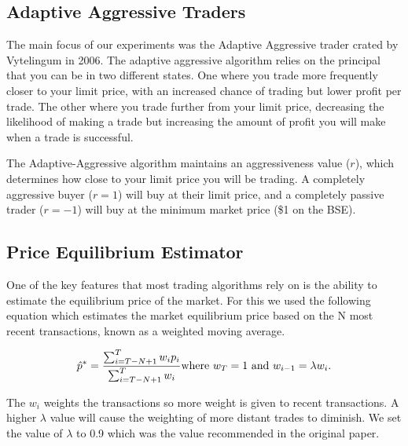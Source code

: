 \documentclass[preprint]{acm_proc_article-sp} %
\begin{document}
\subsection{Adaptive Aggressive Traders} \label{sec:AA}
The main focus of our experiments was the Adaptive Aggressive trader crated by
Vytelingum in 2006\cite{AA_thesis}. The adaptive aggressive algorithm relies on the principal that you can be in
two different states. One where you trade more frequently closer to your limit
price, with an increased chance of trading but lower profit per trade. The other where you
trade further from your limit price, decreasing the likelihood of making a
trade but increasing the amount of profit you will make when a trade is
successful.

The Adaptive-Aggressive algorithm maintains an aggressiveness value ($r$), which
determines how close to your limit price you will be trading. A completely
aggressive buyer ($r = 1$) will buy at their limit price, and a completely
passive trader ($r = -1$) will buy at the minimum market price (\$1 on the BSE).\\


\subsection{Price Equilibrium Estimator}
One of the key features that most trading algorithms rely on is the ability to
estimate the equilibrium price of the market. For this we used the following
equation which estimates the market equilibrium price based on the N most
recent transactions, known as a weighted moving average.

\begin{equation}
    \label{eqn:equilibrium_estimator}
    \hat p^* = \frac{\sum^T_{i=T-N+1}w_ip_i}{\sum^T_{i=T-N+1}w_i}\\
    \text{where $w_T = 1$ and $w_{i-1} = \lambda w_i$.}
\end{equation}

The $w_i$ weights the transactions so more weight is given to recent transactions. A higher $\lambda$ value will cause the weighting of more distant trades to diminish. We set the value of $\lambda$ to 0.9 which was the value recommended in the original paper\cite[p.~100]{AA_thesis}.
\end{document}

